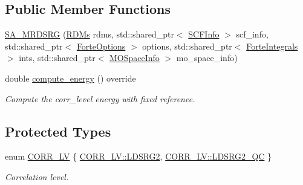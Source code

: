 \subsection*{Public Member Functions}
\begin{DoxyCompactItemize}
\item 
\mbox{\hyperlink{classforte_1_1_s_a___m_r_d_s_r_g_a3231517f861d2ebdda5218278de378b3}{S\+A\+\_\+\+M\+R\+D\+S\+RG}} (\mbox{\hyperlink{classforte_1_1_r_d_ms}{R\+D\+Ms}} rdms, std\+::shared\+\_\+ptr$<$ \mbox{\hyperlink{classforte_1_1_s_c_f_info}{S\+C\+F\+Info}} $>$ scf\+\_\+info, std\+::shared\+\_\+ptr$<$ \mbox{\hyperlink{classforte_1_1_forte_options}{Forte\+Options}} $>$ options, std\+::shared\+\_\+ptr$<$ \mbox{\hyperlink{classforte_1_1_forte_integrals}{Forte\+Integrals}} $>$ ints, std\+::shared\+\_\+ptr$<$ \mbox{\hyperlink{classforte_1_1_m_o_space_info}{M\+O\+Space\+Info}} $>$ mo\+\_\+space\+\_\+info)
\item 
double \mbox{\hyperlink{classforte_1_1_s_a___m_r_d_s_r_g_a9c86de209cdf7a12ed9cb99e9570fff5}{compute\+\_\+energy}} () override
\begin{DoxyCompactList}\small\item\em Compute the corr\+\_\+level energy with fixed reference. \end{DoxyCompactList}\end{DoxyCompactItemize}
\subsection*{Protected Types}
\begin{DoxyCompactItemize}
\item 
enum \mbox{\hyperlink{classforte_1_1_s_a___m_r_d_s_r_g_ae418b53108b2015f68d267bb26d3e6ba}{C\+O\+R\+R\+\_\+\+LV}} \{ \mbox{\hyperlink{classforte_1_1_s_a___m_r_d_s_r_g_ae418b53108b2015f68d267bb26d3e6baa24dbc64461c4bd5e7f00f2742bc02943}{C\+O\+R\+R\+\_\+\+L\+V\+::\+L\+D\+S\+R\+G2}}, 
\mbox{\hyperlink{classforte_1_1_s_a___m_r_d_s_r_g_ae418b53108b2015f68d267bb26d3e6baa852a93207553b725f17b8e1d921bbe6f}{C\+O\+R\+R\+\_\+\+L\+V\+::\+L\+D\+S\+R\+G2\+\_\+\+QC}}
 \}
\begin{DoxyCompactList}\small\item\em Correlation level. \end{DoxyCompactList}\end{DoxyCompactItemize}
